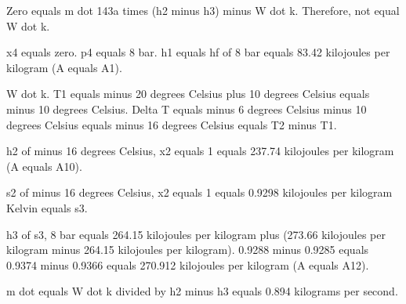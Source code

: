 Zero equals m dot 143a times (h2 minus h3) minus W dot k. Therefore, not equal W dot k.

x4 equals zero. p4 equals 8 bar. h1 equals hf of 8 bar equals 83.42 kilojoules per kilogram (A equals A1).

W dot k. T1 equals minus 20 degrees Celsius plus 10 degrees Celsius equals minus 10 degrees Celsius. Delta T equals minus 6 degrees Celsius minus 10 degrees Celsius equals minus 16 degrees Celsius equals T2 minus T1.

h2 of minus 16 degrees Celsius, x2 equals 1 equals 237.74 kilojoules per kilogram (A equals A10).

s2 of minus 16 degrees Celsius, x2 equals 1 equals 0.9298 kilojoules per kilogram Kelvin equals s3.

h3 of s3, 8 bar equals 264.15 kilojoules per kilogram plus (273.66 kilojoules per kilogram minus 264.15 kilojoules per kilogram). 0.9288 minus 0.9285 equals 0.9374 minus 0.9366 equals 270.912 kilojoules per kilogram (A equals A12).

m dot equals W dot k divided by h2 minus h3 equals 0.894 kilograms per second.